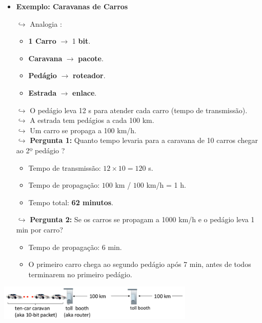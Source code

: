 \begin{itemize}
        \item \textbf{Exemplo: Caravanas de Carros}
        
            $\hookrightarrow$ Analogia :
            \begin{itemize}
                \item \textbf{1 Carro} $\rightarrow$ 1 \textbf{bit}.
                \item \textbf{Caravana} $\rightarrow$ \textbf{pacote}.
                \item \textbf{Pedágio} $\rightarrow$ \textbf{roteador}.
                \item \textbf{Estrada} $\rightarrow$ \textbf{enlace}.
            \end{itemize}
            
            $\hookrightarrow$ O pedágio leva 12 s para atender cada carro (tempo de transmissão). \\
            $\hookrightarrow$ A estrada tem pedágios a cada 100 km. \\
            $\hookrightarrow$ Um carro se propaga a 100 km/h. \\
            $\hookrightarrow$ \textbf{Pergunta 1:} Quanto tempo levaria para a caravana de 10 carros chegar ao 2º pedágio ? 
            
            \begin{itemize}
                \item Tempo de transmissão: $12 \times 10 = 120$ s.
                \item Tempo de propagação: $100$ km / $100$ km/h = 1 h.
                \item Tempo total: \textbf{62 minutos}.
            \end{itemize}
            $\hookrightarrow$ \textbf{Pergunta 2:} Se os carros se propagam a 1000 km/h e o pedágio leva 1 min por carro?
            \begin{itemize}
                \item Tempo de propagação: 6 min.
                \item O primeiro carro chega ao segundo pedágio após 7 min, antes de todos terminarem no primeiro pedágio.
            \end{itemize}
        \end{itemize}

        \begin{center}
            \includegraphics[width=0.7\textwidth]{img/cap-01/carro-pedagio.png}
        \end{center}

